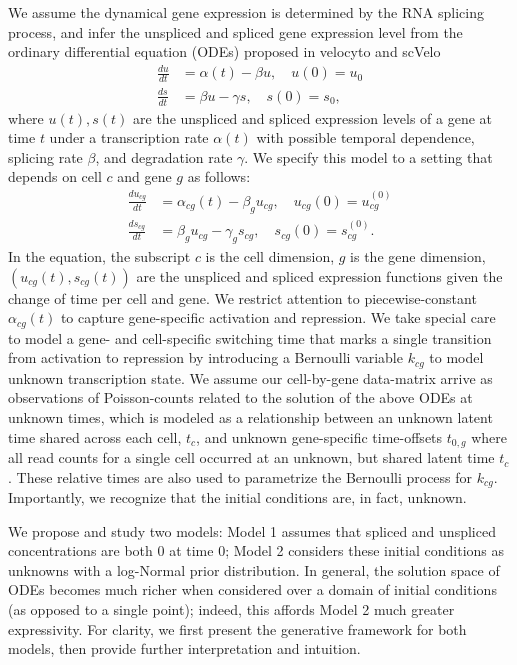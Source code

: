 \documentclass[
  sn-mathphys-num,
  lineno,
  twocolumn]{sn-jnl}
\begin{document}
We assume the dynamical gene expression is determined by the RNA
splicing process, and infer the unspliced and spliced gene expression
level from the ordinary differential equation (ODEs) proposed in
velocyto \citep{La_Manno2018-lj} and scVelo \citep{Bergen2020-pj}
\begin{equation}
  \label{eq-rna}
\begin{aligned}
\frac{du}{dt} &= \alpha(t) - \beta u, \quad u(0) = u_0 \\
   \frac{ds}{dt} &= \beta u - \gamma s, \quad s(0) = s_0,
\end{aligned}
\end{equation} where \(u(t), s(t)\) are the unspliced and spliced
expression levels of a gene at time \(t\) under a transcription rate
\(\alpha(t)\) with possible temporal dependence, splicing rate
\(\beta\), and degradation rate \(\gamma\). We specify this model to a
setting that depends on cell \(c\) and gene \(g\) as follows:
\begin{equation}
    \label{eq-rna-cg}
\begin{aligned}
\frac{du_{cg}}{dt} &= \alpha_{cg}(t) - \beta_{g} u_{cg}, \quad u_{cg}(0) = u_{cg}^{(0)} \\
   \frac{ds_{cg}}{dt} &= \beta_{g} u_{cg} - \gamma_{g} s_{cg}, \quad s_{cg}(0) = s_{cg}^{(0)} .
\end{aligned}
\end{equation} In the equation, the subscript \(c\) is the cell
dimension, \(g\) is the gene dimension,
\(\left( u_{cg}(t), s_{cg}(t) \right)\) are the unspliced and spliced
expression functions given the change of time per cell and gene. We
restrict attention to piecewise-constant \(\alpha_{cg}(t)\) to capture
gene-specific activation and repression. We take special care to model a
gene- and cell-specific switching time that marks a single transition
from activation to repression by introducing a Bernoulli variable
\(k_{cg}\) to model unknown transcription state. We assume our
cell-by-gene data-matrix arrive as observations of Poisson-counts
related to the solution of the above ODEs at unknown times, which is
modeled as a relationship between an unknown latent time shared across
each cell, \(t_c\), and unknown gene-specific time-offsets \(t_{0,g}\)
where all read counts for a single cell occurred at an unknown, but
shared latent time \(t_c\). These relative times are also used to
parametrize the Bernoulli process for \(k_{cg}\). Importantly, we
recognize that the initial conditions are, in fact, unknown.

We propose and study two models: Model 1 assumes that spliced and
unspliced concentrations are both 0 at time 0; Model 2 considers these
initial conditions as unknowns with a log-Normal prior distribution. In
general, the solution space of ODEs becomes much richer when considered
over a domain of initial conditions (as opposed to a single point);
indeed, this affords Model 2 much greater expressivity. For clarity, we
first present the generative framework for both models, then provide
further interpretation and intuition.
\end{document}
